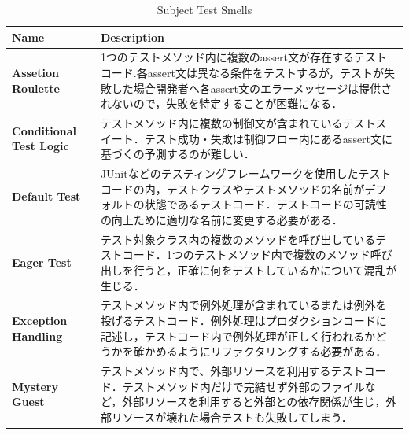 \documentclass[conference]{IEEEtran}
\begin{document}
\begin{table}[hbtp]
\caption{Subject Test Smells}
\begin{tabular}{|l|p{5.2cm}|}
\hline
\textbf{Name}                   & \textbf{Description}                                                                                                       \\ \hline
\textbf{Assetion Roulette}        & 1つのテストメソッド内に複数のassert文が存在するテストコード.各assert文は異なる条件をテストするが，テストが失敗した場合開発者へ各assert文のエラーメッセージは提供されないので，失敗を特定することが困難になる．  \\ \hline
\textbf{Conditional Test Logic} &テストメソッド内に複数の制御文が含まれているテストスイート．テスト成功・失敗は制御フロー内にあるassert文に基づくの予測するのが難しい．                                                                                                                                                                                                           \\ \hline
\textbf{Default Test}            &JUnitなどのテスティングフレームワークを使用したテストコードの内，テストクラスやテストメソッドの名前がデフォルトの状態であるテストコード．テストコードの可読性の向上ために適切な名前に変更する必要がある．                                                                                                      \\ \hline
\textbf{Eager Test }             &テスト対象クラス内の複数のメソッドを呼び出しているテストコード．1つのテストメソッド内で複数のメソッド呼び出しを行うと，正確に何をテストしているかについて混乱が生じる．                                                                                                         \\ \hline
\textbf{Exception Handling}      & テストメソッド内で例外処理が含まれているまたは例外を投げるテストコード．例外処理はプロダクションコードに記述し，テストコード内で例外処理が正しく行われるかどうかを確かめるようにリファクタリングする必要がある．                                                                                                    \\ \hline
\textbf{Mystery Guest}          & テストメソッド内で、外部リソースを利用するテストコード．テストメソッド内だけで完結せず外部のファイルなど，外部リソースを利用すると外部との依存関係が生じ，外部リソースが壊れた場合テストも失敗してしまう．                                                                                                                \\ \hline
\end{tabular}
\end{table}
\end{document}
